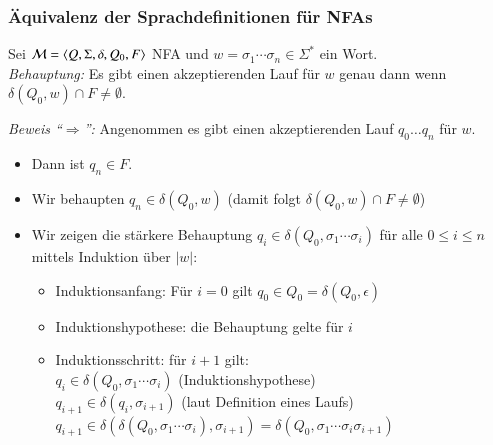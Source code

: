 \documentclass[aspectratio=1610,onlymath]{beamer}
\begin{document}
\begin{frame}[t]\frametitle{Äquivalenz der Sprachdefinitionen für NFAs}

Sei $\mathcal{M}=\langle{Q,\Sigma,\delta,Q_0,F}\rangle$ NFA und $w=\sigma_1\cdots\sigma_n\in\Sigma^*$ ein Wort.\\[1ex]

\emph{Behauptung:} Es gibt einen akzeptierenden Lauf für $w$ genau dann wenn
$\delta(Q_0,w)\cap F \neq \emptyset$.\\[1ex]\pause

\emph{Beweis "`$\Rightarrow$"':}
Angenommen es gibt einen akzeptierenden Lauf $q_0\ldots q_n$ für $w$.\pause
\begin{itemize}
\item Dann ist $q_n\in F$.\pause
\item Wir behaupten $q_n\in \delta(Q_0,w)$ \textcolor{devilscss}{(damit folgt $\delta(Q_0,w)\cap F \neq \emptyset$)}\pause
\item Wir zeigen die stärkere Behauptung $q_i\in \delta(Q_0,\sigma_1\cdots\sigma_i)$ für alle $0\leq i\leq n$
mittels Induktion über $|w|$\pause:
\begin{itemize}
\item Induktionsanfang: Für $i=0$ gilt $q_0\in Q_0 = \delta(Q_0,\epsilon)$\pause
\item Induktionshypothese: die Behauptung gelte für $i$\pause
\item Induktionsschritt: für $i+1$ gilt:\\
	$q_i\in \delta(Q_0,\sigma_1\cdots\sigma_i)$ \textcolor{devilscss}{(Induktionshypothese)}\\
	$q_{i+1}\in\delta(q_i,\sigma_{i+1})$ \textcolor{devilscss}{(laut Definition eines Laufs)}\\
	$q_{i+1}\in\delta(\delta(Q_0,\sigma_1\cdots\sigma_i),\sigma_{i+1})=\delta(Q_0,\sigma_1\cdots\sigma_i\sigma_{i+1})$
\end{itemize}
\end{itemize}
\end{frame}
\end{document}
